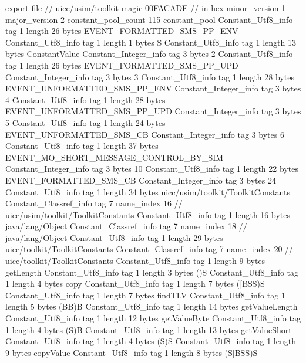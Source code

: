 export file {		// uicc/usim/toolkit
	magic	00FACADE		 // in hex
	minor_version	1
	major_version	2
	constant_pool_count	115
	constant_pool {
		Constant_Utf8_info {
			tag	1
			length	26
			bytes	EVENT_FORMATTED_SMS_PP_ENV
		}
		Constant_Utf8_info {
			tag	1
			length	1
			bytes	S
		}
		Constant_Utf8_info {
			tag	1
			length	13
			bytes	ConstantValue
		}
		Constant_Integer_info {
			tag	3
			bytes	2
		}
		Constant_Utf8_info {
			tag	1
			length	26
			bytes	EVENT_FORMATTED_SMS_PP_UPD
		}
		Constant_Integer_info {
			tag	3
			bytes	3
		}
		Constant_Utf8_info {
			tag	1
			length	28
			bytes	EVENT_UNFORMATTED_SMS_PP_ENV
		}
		Constant_Integer_info {
			tag	3
			bytes	4
		}
		Constant_Utf8_info {
			tag	1
			length	28
			bytes	EVENT_UNFORMATTED_SMS_PP_UPD
		}
		Constant_Integer_info {
			tag	3
			bytes	5
		}
		Constant_Utf8_info {
			tag	1
			length	24
			bytes	EVENT_UNFORMATTED_SMS_CB
		}
		Constant_Integer_info {
			tag	3
			bytes	6
		}
		Constant_Utf8_info {
			tag	1
			length	37
			bytes	EVENT_MO_SHORT_MESSAGE_CONTROL_BY_SIM
		}
		Constant_Integer_info {
			tag	3
			bytes	10
		}
		Constant_Utf8_info {
			tag	1
			length	22
			bytes	EVENT_FORMATTED_SMS_CB
		}
		Constant_Integer_info {
			tag	3
			bytes	24
		}
		Constant_Utf8_info {
			tag	1
			length	34
			bytes	uicc/usim/toolkit/ToolkitConstants
		}
		Constant_Classref_info {
			tag	7
			name_index	16		// uicc/usim/toolkit/ToolkitConstants
		}
		Constant_Utf8_info {
			tag	1
			length	16
			bytes	java/lang/Object
		}
		Constant_Classref_info {
			tag	7
			name_index	18		// java/lang/Object
		}
		Constant_Utf8_info {
			tag	1
			length	29
			bytes	uicc/toolkit/ToolkitConstants
		}
		Constant_Classref_info {
			tag	7
			name_index	20		// uicc/toolkit/ToolkitConstants
		}
		Constant_Utf8_info {
			tag	1
			length	9
			bytes	getLength
		}
		Constant_Utf8_info {
			tag	1
			length	3
			bytes	()S
		}
		Constant_Utf8_info {
			tag	1
			length	4
			bytes	copy
		}
		Constant_Utf8_info {
			tag	1
			length	7
			bytes	([BSS)S
		}
		Constant_Utf8_info {
			tag	1
			length	7
			bytes	findTLV
		}
		Constant_Utf8_info {
			tag	1
			length	5
			bytes	(BB)B
		}
		Constant_Utf8_info {
			tag	1
			length	14
			bytes	getValueLength
		}
		Constant_Utf8_info {
			tag	1
			length	12
			bytes	getValueByte
		}
		Constant_Utf8_info {
			tag	1
			length	4
			bytes	(S)B
		}
		Constant_Utf8_info {
			tag	1
			length	13
			bytes	getValueShort
		}
		Constant_Utf8_info {
			tag	1
			length	4
			bytes	(S)S
		}
		Constant_Utf8_info {
			tag	1
			length	9
			bytes	copyValue
		}
		Constant_Utf8_info {
			tag	1
			length	8
			bytes	(S[BSS)S
}}}
